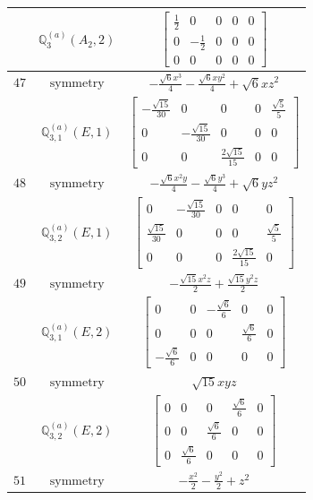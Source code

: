 \documentclass[fleqn,8pt,landscape]{jsarticle}
\begin{document}
\begin{longtable}{ccc}
$  $ & $ \mathbb{Q}_{3}^{(a)}(A_{2},2) $ & $ \begin{bmatrix} \frac{1}{2} & 0 & 0 & 0 & 0 \\ 0 & - \frac{1}{2} & 0 & 0 & 0 \\ 0 & 0 & 0 & 0 & 0 \end{bmatrix} $ \\ \hline
$ 47 $ & $ \text{symmetry} $ & $ - \frac{\sqrt{6} x^{3}}{4} - \frac{\sqrt{6} x y^{2}}{4} + \sqrt{6} x z^{2} $ \\
$  $ & $ \mathbb{Q}_{3,1}^{(a)}(E,1) $ & $ \begin{bmatrix} - \frac{\sqrt{15}}{30} & 0 & 0 & 0 & \frac{\sqrt{5}}{5} \\ 0 & - \frac{\sqrt{15}}{30} & 0 & 0 & 0 \\ 0 & 0 & \frac{2 \sqrt{15}}{15} & 0 & 0 \end{bmatrix} $ \\ \hline
$ 48 $ & $ \text{symmetry} $ & $ - \frac{\sqrt{6} x^{2} y}{4} - \frac{\sqrt{6} y^{3}}{4} + \sqrt{6} y z^{2} $ \\
$  $ & $ \mathbb{Q}_{3,2}^{(a)}(E,1) $ & $ \begin{bmatrix} 0 & - \frac{\sqrt{15}}{30} & 0 & 0 & 0 \\ \frac{\sqrt{15}}{30} & 0 & 0 & 0 & \frac{\sqrt{5}}{5} \\ 0 & 0 & 0 & \frac{2 \sqrt{15}}{15} & 0 \end{bmatrix} $ \\ \hline
$ 49 $ & $ \text{symmetry} $ & $ - \frac{\sqrt{15} x^{2} z}{2} + \frac{\sqrt{15} y^{2} z}{2} $ \\
$  $ & $ \mathbb{Q}_{3,1}^{(a)}(E,2) $ & $ \begin{bmatrix} 0 & 0 & - \frac{\sqrt{6}}{6} & 0 & 0 \\ 0 & 0 & 0 & \frac{\sqrt{6}}{6} & 0 \\ - \frac{\sqrt{6}}{6} & 0 & 0 & 0 & 0 \end{bmatrix} $ \\ \hline
$ 50 $ & $ \text{symmetry} $ & $ \sqrt{15} x y z $ \\
$  $ & $ \mathbb{Q}_{3,2}^{(a)}(E,2) $ & $ \begin{bmatrix} 0 & 0 & 0 & \frac{\sqrt{6}}{6} & 0 \\ 0 & 0 & \frac{\sqrt{6}}{6} & 0 & 0 \\ 0 & \frac{\sqrt{6}}{6} & 0 & 0 & 0 \end{bmatrix} $ \\ \hline
$ 51 $ & $ \text{symmetry} $ & $ - \frac{x^{2}}{2} - \frac{y^{2}}{2} + z^{2} $ \\

\end{longtable}
\end{document}
